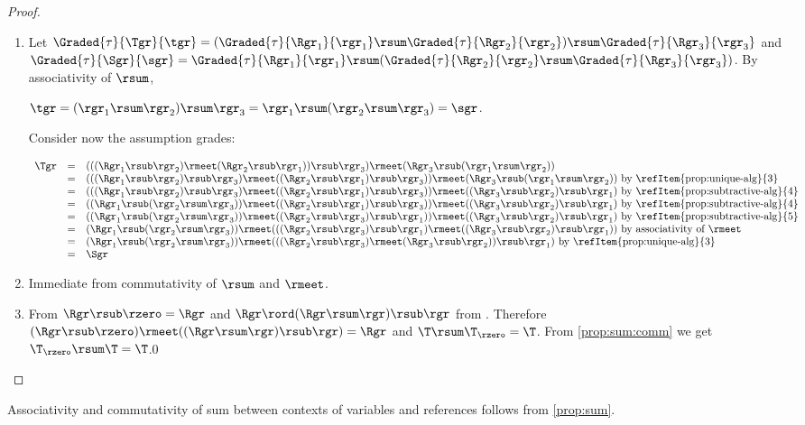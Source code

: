\begin{proof}\hfill
\begin{enumerate}
\item
Let $\Graded{\tau}{\Tgr}{\tgr}=(\Graded{\tau}{\Rgr_1}{\rgr_1}\rsum\Graded{\tau}{\Rgr_2}{\rgr_2})\rsum\Graded{\tau}{\Rgr_3}{\rgr_3}$ and
$\Graded{\tau}{\Sgr}{\sgr}=\Graded{\tau}{\Rgr_1}{\rgr_1}\rsum(\Graded{\tau}{\Rgr_2}{\rgr_2}\rsum\Graded{\tau}{\Rgr_3}{\rgr_3})$. By associativity of $\rsum$,
\begin{center}
$\tgr=(\rgr_1\rsum\rgr_2)\rsum\rgr_3=\rgr_1\rsum(\rgr_2\rsum\rgr_3)=\sgr$.
\end{center}
Consider now the assumption grades:
\begin{center}
$
\begin{array}{lcl}
\Tgr&=& (((\Rgr_1 \rsub \rgr_2) \rmeet (\Rgr_2 \rsub \rgr_1))\rsub\rgr_3)\rmeet(\Rgr_3 \rsub (\rgr_1\rsum\rgr_2))\\
&=& (((\Rgr_1 \rsub \rgr_2)\rsub\rgr_3) \rmeet ((\Rgr_2 \rsub \rgr_1)\rsub\rgr_3))\rmeet(\Rgr_3 \rsub (\rgr_1\rsum\rgr_2))\text{ by \refItem{prop:unique-alg}{3}}\\
&=& (((\Rgr_1 \rsub \rgr_2)\rsub\rgr_3) \rmeet ((\Rgr_2 \rsub \rgr_1)\rsub\rgr_3))\rmeet((\Rgr_3 \rsub\rgr_2)\rsub\rgr_1)\text{ by \refItem{prop:subtractive-alg}{4}}\\
&=&((\Rgr_1 \rsub( \rgr_2\rsum\rgr_3)) \rmeet ((\Rgr_2 \rsub \rgr_1)\rsub\rgr_3))\rmeet((\Rgr_3 \rsub\rgr_2)\rsub\rgr_1)\text{ by \refItem{prop:subtractive-alg}{4}}\\
&=& ((\Rgr_1 \rsub( \rgr_2\rsum\rgr_3)) \rmeet ((\Rgr_2 \rsub \rgr_3)\rsub\rgr_1))\rmeet((\Rgr_3 \rsub\rgr_2)\rsub\rgr_1)\text{ by \refItem{prop:subtractive-alg}{5}}\\
&=& (\Rgr_1 \rsub( \rgr_2\rsum\rgr_3)) \rmeet (((\Rgr_2 \rsub \rgr_3)\rsub\rgr_1)\rmeet((\Rgr_3 \rsub\rgr_2)\rsub\rgr_1))\text{ by associativity of $\rmeet$}\\
&=& (\Rgr_1 \rsub( \rgr_2\rsum\rgr_3)) \rmeet (((\Rgr_2 \rsub \rgr_3)\rmeet(\Rgr_3 \rsub\rgr_2)) \rsub\rgr_1)\text{ by \refItem{prop:unique-alg}{3}}\\
&=&\Sgr
\end{array}
$
\end{center}
\item Immediate from commutativity of $\rsum$ and $\rmeet$.
\item From  $\Rgr\rsub\rzero=\Rgr$ and $\Rgr\rord(\Rgr\rsum\rgr)\rsub\rgr$ from . Therefore
$(\Rgr\rsub\rzero)\rmeet((\Rgr\rsum\rgr)\rsub\rgr)=\Rgr$ and $\T\rsum\T_{\rzero}=\T$. From \cref{prop:sum:comm}  we get $\T_{\rzero}\rsum\T=\T$.0
\end{enumerate}
\end{proof}
Associativity and commutativity of sum between contexts of variables and references follows from \cref{prop:sum}.

